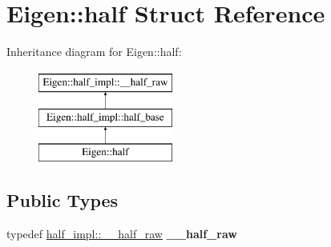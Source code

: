 \hypertarget{struct_eigen_1_1half}{}\section{Eigen\+::half Struct Reference}
\label{struct_eigen_1_1half}
Inheritance diagram for Eigen\+::half\+:\begin{figure}[H]
\begin{center}
\leavevmode
\includegraphics[height=3.000000cm]{struct_eigen_1_1half}
\end{center}
\end{figure}
\subsection*{Public Types}
\begin{DoxyCompactItemize}
\item 
\mbox{\label{struct_eigen_1_1half_a128c010ae7f6f974d57f2f8fcabff25a}} 
typedef \mbox{\hyperlink{struct_eigen_1_1half__impl_1_1____half__raw}{half\+\_\+impl\+::\+\_\+\+\_\+half\+\_\+raw}} {\bfseries \+\_\+\+\_\+half\+\_\+raw}
\end{DoxyCompactItemize}
